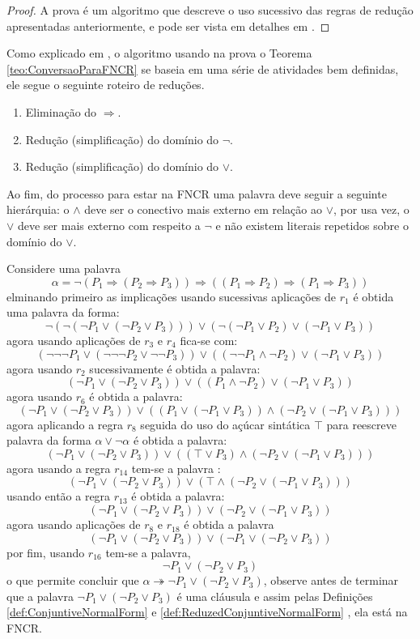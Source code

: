 \begin{proof}
  A prova é um algoritmo que descreve o uso sucessivo das regras de redução apresentadas anteriormente, e pode ser vista em detalhes em \cite{benja-Logica}.
\end{proof}

Como explicado em \cite{joaoPavao2014}, o algoritmo usando na prova o Teorema \ref{teo:ConversaoParaFNCR} se baseia em uma série de atividades bem definidas, ele segue o seguinte roteiro de reduções.

\begin{enumerate}
  \item Eliminação do $\Rightarrow$.
  \item Redução (simplificação) do domínio do $\neg$.
  \item Redução (simplificação) do domínio do $\lor$.
\end{enumerate}

Ao fim, do processo para estar na FNCR uma palavra deve seguir a seguinte hierárquia: o $\land$ deve ser o conectivo mais externo em relação ao $\lor$, por usa vez, o $\lor$ deve ser mais externo com respeito a $\neg$ e não existem literais repetidos sobre o domínio do $\lor$.

\begin{exemplo}
  Considere uma palavra 
  $$\alpha = \neg(P_1 \Rightarrow (P_2 \Rightarrow P_3 )) \Rightarrow ((P_1 \Rightarrow P_2 ) \Rightarrow (P_1 \Rightarrow P_3))$$
  elminando primeiro as implicações usando sucessivas aplicações de $r_1$ é obtida uma palavra da forma:
  $$\neg(\neg(\neg P_1 \lor (\neg P_2 \lor P_3 ))) \lor (\neg(\neg P_1 \lor P_2 ) \lor (\neg P_1 \lor P_3 ))$$
  agora usando aplicações de $r_3$ e $r_4$ fica-se com:
  $$(\neg\neg\neg P_1 \lor (\neg\neg\neg P_2 \lor \neg\neg P_3 )) \lor ((\neg\neg P_1 \land \neg P_2 ) \lor (\neg P_1 \lor P_3 ))$$
  agora usando $r_2$ sucessivamente é obtida a palavra:
  $$(\neg P_1 \lor (\neg P_2 \lor P_3 )) \lor ((P_1 \land \neg P_2 ) \lor (\neg P_1 \lor P_3 ))$$
  agora usando $r_6$ é obtida a palavra:
  $$(\neg P_1 \lor (\neg P_2 \lor P_3 )) \lor ((P_1 \lor (\neg P_1 \lor P_3 )) \land (\neg P_2 \lor (\neg P_1 \lor P_3 )))$$
  agora aplicando a regra $r_8$ seguida do uso do açúcar sintática $\top$ para reescreve palavra da forma $\alpha \lor \neg \alpha$ é obtida a palavra:
  $$(\neg P_1 \lor (\neg P_2 \lor P_3 )) \lor ((\top \lor P_3 ) \land (\neg P_2 \lor (\neg P_1 \lor P_3 )))$$
  agora usando a regra $r_{14}$ tem-se a palavra :
  $$(\neg P_1 \lor (\neg P_2 \lor P_3 )) \lor (\top \land (\neg P_2 \lor (\neg P_1 \lor P_3 )))$$
  usando então a regra $r_{13}$ é obtida a palavra:
  $$(\neg P_1 \lor (\neg P_2 \lor P_3 )) \lor (\neg P_2 \lor (\neg P_1 \lor P_3 ))$$
  agora usando aplicações de $r_8$ e $r_{18}$ é obtida a palavra
  $$(\neg P_1 \lor (\neg P_2 \lor P_3 )) \lor (\neg P_1 \lor (\neg P_2 \lor P_3 ))$$
  por fim, usando $r_{16}$ tem-se a palavra,
  $$\neg P_1 \lor (\neg P_2 \lor P_3)$$
  o que permite concluir que $\alpha \twoheadrightarrow \neg P_1 \lor (\neg P_2 \lor P_3)$, observe antes de terminar que a palavra $\neg P_1 \lor (\neg P_2 \lor P_3)$ é uma cláusula e assim pelas Definições \ref{def:ConjuntiveNormalForm} e \ref{def:ReduzedConjuntiveNormalForm} , ela está na FNCR.
\end{exemplo}


